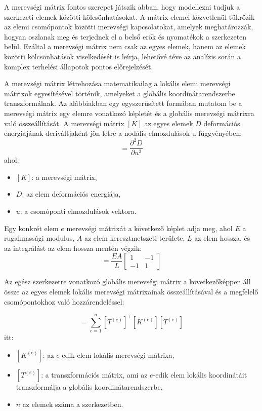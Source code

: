 \documentclass[12pt,a4paper,oneside]{report}
\begin{document}
A merevségi mátrix fontos szerepet játszik abban, hogy modellezni tudjuk a szerkezeti elemek közötti kölcsönhatásokat. A mátrix elemei közvetlenül tükrözik az elemi csomópontok közötti merevségi kapcsolatokat, amelyek meghatározzák, hogyan oszlanak meg és terjednek el a belső erők és nyomatékok a szerkezeten belül. Ezáltal a merevségi mátrix nem csak az egyes elemek, hanem az elemek közötti kölcsönhatások viselkedését is leírja, lehetővé téve az analízis során a komplex terhelési állapotok pontos előrejelzését.

A merevségi mátrix létrehozása matematikailag a lokális elemi merevségi mátrixok egyesítésével történik, amelyeket a globális koordinátarendszerbe transzformálnak. Az alábbiakban egy egyszerűsített formában mutatom be a merevségi mátrix egy elemre vonatkozó képletét és a globális merevségi mátrixra való összeállítását. A merevségi mátrix $[K]$ az egyes elemek $D$ deformációs energiajának deriváltjaként jön létre a nodális elmozdulások u függvényében:
\begin{equation}
    [K] = \dfrac{\partial^2 D}{\partial u^2}
\end{equation}
ahol:
\begin{itemize}
    \item $[K]$: a merevségi mátrix,
    \item $D$: az elem deformációs energiája,
    \item $u$: a csomóponti elmozdulások vektora.
\end{itemize}

Egy konkrét elem $e$ merevségi mátrixát a következő képlet adja meg, ahol $E$ a rugalmassági modulus, $A$ az elem keresztmetszeti területe, $L$ az elem hossza, és az integrálást az elem hossza mentén végzik:
\begin{equation}
    [K^{(e)}] = \frac{E A}{L}
    \begin{bmatrix}
        1   &   -1 \\
        -1  &   1
    \end{bmatrix}
\end{equation}

Az egész szerkezetre vonatkozó globális merevségi mátrix a következőképpen áll össze az egyes elemek lokális merevségi mátrixainak összeállításával és a megfelelő csomópontokhoz való hozzárendeléssel:

\begin{equation}
    [K_{\text{global}}] = \sum_{e=1}^{n} [T^{(e)}]^\top [K^{(e)}] [T^{(e)}]
\end{equation}
itt:
\begin{itemize}
    \item $[K^{(e)}]$: az $e$-edik elem lokális merevségi mátrixa,
    \item $[T^{(e)}]$: a transzformációs mátrix, ami az $e$-edik elem lokális koordinátáit transzformálja a globális koordinátarendszerbe,
    \item $n$ az elemek száma a szerkezetben.
\end{itemize}
\end{document}
